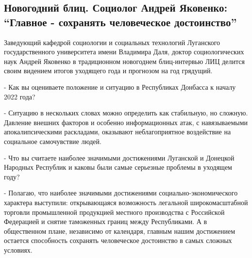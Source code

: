  
 
 
 
 
\subsection{Новогодний блиц. Социолог Андрей Яковенко: \enquote{Главное - сохранять человеческое достоинство}}
\label{sec:30_12_2021.stz.news.lnr.lug_info.1.dostoinstvo}


Заведующий кафедрой социологии и социальных технологий Луганского
государственного университета имени Владимира Даля, доктор социологических наук
Андрей Яковенко в традиционном новогоднем блиц-интервью ЛИЦ делится своим
видением итогов уходящего года и прогнозом на год грядущий.


- Как вы оцениваете положение и ситуацию в Республиках Донбасса к началу 2022
года?

- Ситуацию в нескольких словах можно определить как стабильную, но сложную.
Давление внешних факторов и особенно информационных атак, с навязываемыми
апокалипсическими раскладами, оказывают неблагоприятное воздействие на
социальное самочувствие людей.

- Что вы считаете наиболее значимыми достижениями Луганской и Донецкой Народных
Республик и каковы были самые серьезные проблемы в уходящем году?

- Полагаю, что наиболее значимыми достижениями социально-экономического
характера выступили: открывающаяся возможность легальной широкомасштабной
торговли промышленной продукцией местного производства с Российской Федерацией
и снятие таможенных границ между Республиками. А в общественном плане,
независимо от календаря, главным нашим достижением остается способность
сохранять человеческое достоинство в самых сложных условиях.

